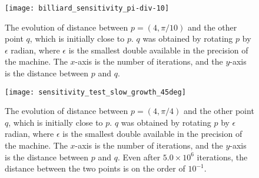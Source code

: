 \documentclass[12pt,twoside]{book}
\begin{document}
\begin{figure}[ht]
  \begin{center}
    \texttt{[image: billiard\_sensitivity\_pi-div-10]}
    \caption{The evolution of distance between $p = (4, \pi/10)$ and the other point $q$, which is initially close to $p$.
      $q$ was obtained by rotating $p$ by $\epsilon$ radian, where $\epsilon$ is the smallest double available in the precision of the machine.
      The $x$-axis is the number of iterations, and the $y$-axis is the distance between $p$ and $q$.
    }
    \label{fig:sensitivity1}
  \end{center}
\end{figure}
\begin{figure}[ht]
  \begin{center}
    \texttt{[image: sensitivity\_test\_slow\_growth\_45deg]}
    \caption{The evolution of distance between $p = (4, \pi/4)$ and the other point $q$, which is initially close to $p$.
      $q$ was obtained by rotating $p$ by $\epsilon$ radian, where $\epsilon$ is the smallest double available in the precision of the machine.
      The $x$-axis is the number of iterations, and the $y$-axis is the distance between $p$ and $q$.
      Even after $5.0 \times 10^6$ iterations, the distance between the two points is on the order of $10^{-1}$.
    }
    \label{fig:sensitivity2}
  \end{center}
\end{figure}




\printindex
\end{document}
